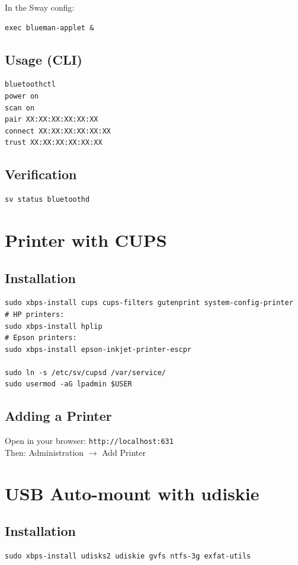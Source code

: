 \documentclass[12pt, a4paper]{book}
\begin{document}
In the Sway config:
\begin{lstlisting}
exec blueman-applet &
\end{lstlisting}

\subsection{Usage (CLI)}
\begin{lstlisting}
bluetoothctl
power on
scan on
pair XX:XX:XX:XX:XX:XX
connect XX:XX:XX:XX:XX:XX
trust XX:XX:XX:XX:XX:XX
\end{lstlisting}

\subsection{Verification}
\begin{lstlisting}
sv status bluetoothd
\end{lstlisting}

\section{Printer with CUPS}

\subsection{Installation}
\begin{lstlisting}
sudo xbps-install cups cups-filters gutenprint system-config-printer
# HP printers:
sudo xbps-install hplip
# Epson printers:
sudo xbps-install epson-inkjet-printer-escpr

sudo ln -s /etc/sv/cupsd /var/service/
sudo usermod -aG lpadmin $USER
\end{lstlisting}

\subsection{Adding a Printer}
Open in your browser: \texttt{http://localhost:631}\\
Then: Administration $\to$ Add Printer

\section{USB Auto-mount with udiskie}

\subsection{Installation}
\begin{lstlisting}
sudo xbps-install udisks2 udiskie gvfs ntfs-3g exfat-utils
\end{lstlisting}
\end{document}
